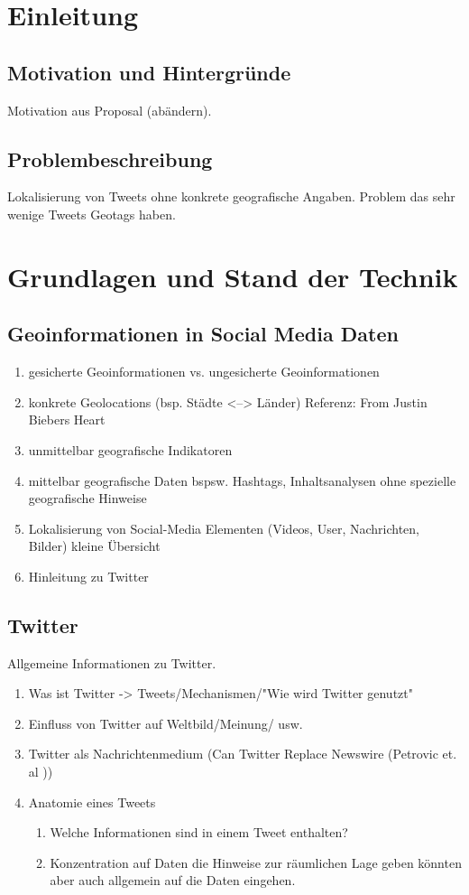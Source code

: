 \chapter{Einleitung}

\section{Motivation und Hintergründe}
Motivation aus Proposal (abändern).

\section{Problembeschreibung} 
Lokalisierung von Tweets ohne konkrete geografische Angaben. 
Problem das sehr wenige Tweets Geotags haben.

\chapter{Grundlagen und Stand der Technik}
	
	\section{Geoinformationen in Social Media Daten}
 		\begin{enumerate}
 			\item {} gesicherte Geoinformationen vs. ungesicherte Geoinformationen
 			\item konkrete Geolocations (bsp. Städte <--> Länder) Referenz: From Justin Biebers Heart 
 			\item unmittelbar geografische Indikatoren
			\item mittelbar geografische Daten bspsw. Hashtags, Inhaltsanalysen ohne spezielle geografische Hinweise
 			\item Lokalisierung von Social-Media Elementen (Videos, User, Nachrichten, Bilder) kleine Übersicht
 			\item Hinleitung zu Twitter  
 		\end{enumerate}

	\section{Twitter}
		Allgemeine Informationen zu Twitter. 
		\begin{enumerate}
			\item Was ist Twitter -> Tweets/Mechanismen/"Wie wird Twitter genutzt"
			\item {} Einfluss von Twitter auf Weltbild/Meinung/ usw.
			\item Twitter als Nachrichtenmedium (Can Twitter Replace Newswire (Petrovic et. al ))
			\item Anatomie eines Tweets 
				\begin{enumerate}
					\item Welche Informationen sind in einem Tweet enthalten? 
					\item Konzentration auf Daten die Hinweise zur räumlichen Lage geben könnten aber auch allgemein auf die Daten eingehen.
				\end{enumerate}
		\end{enumerate}
		

